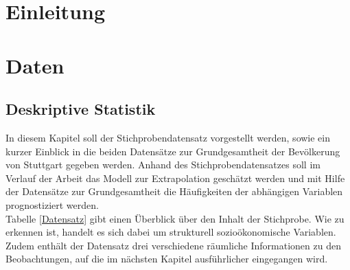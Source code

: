 \documentclass{Vorlage}
\begin{document}
\restoregeometry


\pagestyle{plain}

\tableofcontents %

\newpage %

\listoffigures %

\listoftables %

\newpage



\pagestyle{fancy}

\section{Einleitung}

\newpage

\section{Daten}
\subsection{Deskriptive Statistik}

In diesem Kapitel soll der Stichprobendatensatz vorgestellt werden, sowie ein kurzer Einblick in die beiden Datensätze zur Grundgesamtheit der Bevölkerung von Stuttgart gegeben werden. Anhand des Stichprobendatensatzes soll im Verlauf der Arbeit das Modell zur Extrapolation geschätzt werden und mit Hilfe der Datensätze zur Grundgesamtheit die Häufigkeiten der abhängigen Variablen prognostiziert werden. \\
Tabelle \ref{Datensatz} gibt einen Überblick über den Inhalt der Stichprobe. Wie zu erkennen ist, handelt es sich dabei um strukturell sozioökonomische Variablen. Zudem enthält der Datensatz drei verschiedene räumliche Informationen zu den Beobachtungen, auf die im nächsten Kapitel ausführlicher eingegangen wird.\\
\end{document}
